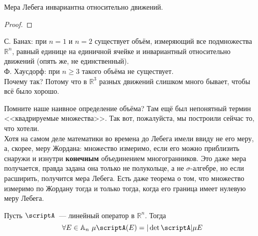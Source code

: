\documentclass{article}
\begin{document}
    \begin{claim}
        Мера Лебега инвариантна относительно движений.
    \end{claim}
    \begin{proof}
        
    \end{proof}
    \begin{remark}
        С. Банах: при $n=1$ и $n=2$ существует объём, измеряющий все подмножества $\mathbb R^n$, равный единице на единичной ячейке и инвариантный относительно движений (опять же, не единственный).\\
        Ф. Хаусдорф: при $n\geqslant 3$ такого объёма не существует.\\
        Почему так? Потому что в $\mathbb R^3$ разных движений слишком много бывает, чтобы всё было хорошо.
    \end{remark}
    \begin{remark}
        Помните наше наивное определение объёма? Там ещё был непонятный термин <<квадрируемые множества>>. Так вот, пожалуйста, мы построили сейчас то, что хотели.\\
        Хотя на самом деле математики во времена до Лебега имели ввиду не его меру, а, скорее, меру Жордана: множество измеримо, если его можно приблизить снаружи и изнутри \textbf{конечным} объединением многогранников. Это даже мера получается, правда задана она только не полукольце, а не $\sigma$-алгебре, но если расширить, получится мера Лебега. Есть даже теорема о том, что множество измеримо по Жордану тогда и только тогда, когда его граница имеет нулевую меру Лебега.
    \end{remark}
    \begin{theorem}
        \label{Мера Лебега при линейном отображении}
        \label{Теорема о геометрическом смысле определителя}
        Пусть $\scriptA$~--- линейный оператор в $\mathbb R^n$. Тогда
        $$\forall E\in\mathbb A_n~\mu\scriptA(E)=|\det\scriptA|\mu E$$
    \end{theorem}
\end{document}
